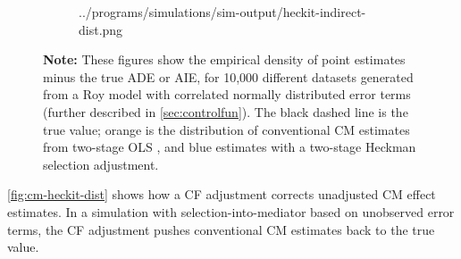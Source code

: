 \begin{figure}[h!]
\begin{subfigure}[c]{0.475\textwidth}
{            ../programs/simulations/sim-output/heckit-indirect-dist.png}
    \end{subfigure}
    \label{fig:cm-heckit-dist}
    \justify
    \footnotesize    
    \textbf{Note:}
    These figures show the empirical density of point estimates minus the true ADE or AIE, for 10,000 different datasets generated from a Roy model with correlated normally distributed error terms (further described in \autoref{sec:controlfun}).
    The black dashed line is the true value;
    orange is the distribution of conventional CM estimates from two-stage OLS \citep{imai2010identification},
    and blue estimates with a two-stage Heckman selection adjustment.
\end{figure}

\autoref{fig:cm-heckit-dist} shows how a CF adjustment corrects unadjusted CM effect estimates.
In a simulation with selection-into-mediator based on unobserved error terms, the CF adjustment pushes conventional CM estimates back to the true value. 
